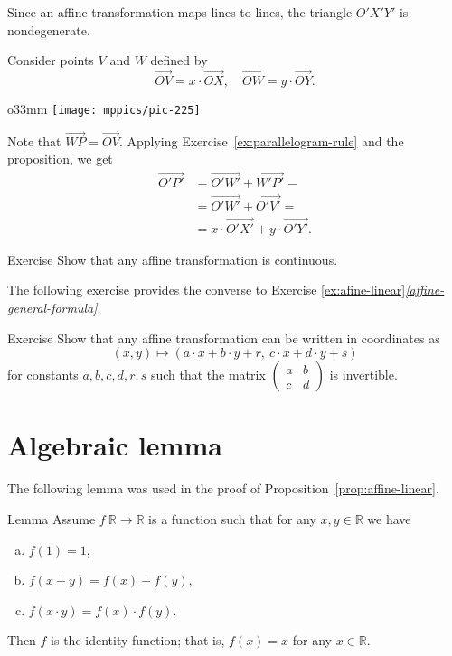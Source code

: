 Since an affine transformation maps lines to lines, the triangle
$O'X'Y'$ is nondegenerate.

Consider points $V$ and $W$ defined by
\[\overrightarrow{OV}=x\cdot\overrightarrow{OX},
\quad
\overrightarrow{OW}=y\cdot\overrightarrow{OY}.
\]

{

\begin{wrapfigure}{o}{33mm}
\centering
\vskip-0mm
\texttt{[image: mppics/pic-225]}
\end{wrapfigure}

Note that 
$\overrightarrow{WP}=\overrightarrow{OV}$.
Applying Exercise~\ref{ex:parallelogram-rule} and the proposition, we get
\begin{align*}\overrightarrow{O'P'}&=\overrightarrow{O'W'}+\overrightarrow{W'P'}=
\\
&=\overrightarrow{O'W'}+\overrightarrow{O'V'}=
\\
&=x\cdot\overrightarrow{O'X'}+y\cdot\overrightarrow{O'Y'}.
\end{align*}
\qedsf

}

\begin{thm}{Exercise}\label{ex:affine-continuous}
Show that any affine transformation is continuous.
\end{thm}

The following exercise provides the converse to Exercise \ref{ex:afine-linear}\textit{\ref{affine-general-formula}}.

\begin{thm}{Exercise}\label{ex:affine-coordinates}
Show that any affine transformation can be written in coordinates as 
\[(x,y)\mapsto(a\cdot x+b\cdot y+r,\ c\cdot x+d\cdot y+s)\]
for constants $a,b,c,d,r,s$ such that the matrix $(\begin{smallmatrix}a&b\\c&d\end{smallmatrix})$ is invertible. 
\end{thm}


\section{Algebraic lemma}

The following lemma was used in the proof of Proposition~\ref{prop:affine-linear}.

\begin{thm}{Lemma}\label{lem:R-auto}
Assume $f\:\mathbb{R}\to\mathbb{R}$ is a function such that for any $x,y\in\mathbb{R}$ we have
\begin{enumerate}[(a)]
\item\label{lem:R-auto:a} $f(1)=1$,
\item\label{lem:R-auto:b} $f(x+y)=f(x)+f(y)$,
\item\label{lem:R-auto:c} $f(x\cdot y)=f(x)\cdot f(y)$.
\end{enumerate}

Then $f$ is the identity function; that is,
$f(x)=x$ for any $x\in \mathbb{R}$.
\end{thm}

